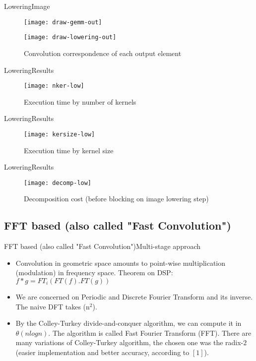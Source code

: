 \begin{frame}{Lowering}{Image}
\begin{figure}[ht] \label{ fig8} 
    \texttt{[image: draw-gemm-out]} 
    \caption{Output (C) obtained from lowered image (A) multiplied by lowered kernel (B)} 
    
    \texttt{[image: draw-lowering-out]}
    \caption{Convolution correspondence of each output element} 
    \end{figure}
\end{frame}

 \begin{frame}{Lowering}{Results}
\begin{figure}[ht] \label{ fig7} 
      \texttt{[image: nker-low]}
    \caption{Execution time by number of kernels} 
\end{figure}
\end{frame}

\begin{frame}{Lowering}{Results}
\begin{figure}[ht] \label{ fig7} 
     \texttt{[image: kersize-low]}
    \caption{Execution time by kernel size} 
\end{figure}
\end{frame}

\begin{frame}{Lowering}{Results}
\begin{figure}[ht] \label{ fig7} 
     \texttt{[image: decomp-low]}
    \caption{Decomposition cost (before blocking on image lowering step)} 
\end{figure}
\end{frame}

\subsection{FFT based (also called "Fast Convolution")}

\begin{frame}{FFT based (also called "Fast Convolution")}{Multi-stage approach}
  \begin{itemize}
  \item {
    Convolution in geometric space amounts to point-wise multiplication (modulation) in frequency space. Theorem on DSP: $f * g = FT_i(FT(f).FT(g))$
  }

  \item {
    We are concerned on Periodic and Discrete Fourier Transform and its inverse. The naive DFT takes \theta(n$^{2}$).  
  }
  \item {
   By the Colley-Turkey divide-and-conquer algorithm, we can compute it in $\theta(nlogn)$. The algorithm is called \alert{Fast Fourier Transform (FFT)}. There are many variations of Colley-Turkey algorithm, the chosen one was the radix-$2$ (easier implementation and better accuracy, according to $[1]$).
  }
  \end{itemize}
\end{frame}

